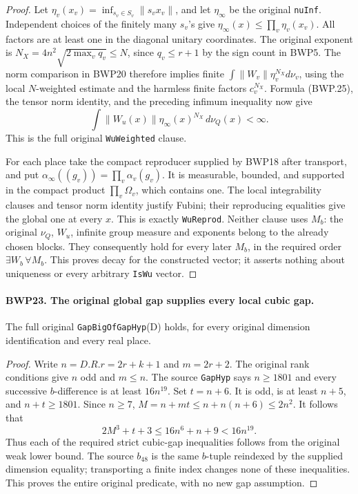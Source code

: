 \begin{proof}
Let \(\eta_v(x_v)=\inf_{s_v\in S_v}\|s_vx_v\|\), and
let \(\eta_\infty\) be the original \texttt{nuInf}.
Independent choices of the finitely many \(s_v\)'s give
\(\eta_\infty(x)\le\prod_v\eta_v(x_v)\).
All factors are at least one in the diagonal unitary coordinates.
The original exponent is
\(N_X=4n^2\sqrt{2\max_v q_v}\le N\), since
\(q_v\le r+1\) by the sign count in BWP5.
The norm comparison in BWP20 therefore implies finite
\(\int\|W_v\|\eta_v^{N_X}d\nu_v\), using the local
\(N\)-weighted estimate and the harmless finite factors
\(c_v^{N_X}\).  Formula (BWP.25), the tensor norm identity, and
the preceding infimum inequality now give
\[
 \int\|W_u(x)\|\eta_\infty(x)^{N_X}\,d\nu_Q(x)<\infty.
 \tag{BWP.27}
\]
This is the full original \texttt{WuWeighted} clause.

For each place take the compact reproducer supplied by BWP18 after
transport, and put \(\alpha_\infty((g_v))=\prod_v\alpha_v(g_v)\).
It is measurable, bounded, and supported in the compact product
\(\prod_v\Omega_v\), which contains one.  The local integrability
clauses and tensor norm identity justify Fubini; their reproducing
equalities give the global one at every \(x\).  This is exactly
\texttt{WuReprod}.  Neither clause uses \(M_b\): the original
\(\nu_Q\), \(W_u\), infinite group measure and exponents belong
to the already chosen blocks.  They consequently hold for every
later \(M_b\), in the required order \(\exists W_b\,\forall M_b\).
This proves decay for the constructed vector; it asserts nothing
about uniqueness or every arbitrary \texttt{IsWu} vector.
\end{proof}

\paragraph{BWP23. The original global gap supplies every local cubic gap.}
\label{claim:BWP23}
The full original \texttt{GapBigOfGapHyp}(D) holds, for every
original dimension identification and every real place.

\begin{proof}
Write \(n=D.R.r=2r+k+1\) and \(m=2r+2\).  The original
rank conditions give \(n\) odd and \(m\le n\).
The source \texttt{GapHyp} says \(n\ge1801\) and every
successive \(b\)-difference is at least \(16n^{19}\).
Set \(t=n+6\).  It is odd, is at least \(n+5\), and
\(n+t\ge1801\).  Since \(n\ge7\),
\(M=n+mt\le n+n(n+6)\le2n^2\).
It follows that
\[
 2M^3+t+3\le16n^6+n+9<16n^{19}.
\]
Thus each of the required strict cubic-gap inequalities follows from
the original weak lower bound.  The source \(b_{48}\) is the
same \(b\)-tuple reindexed by the supplied dimension equality;
transporting a finite index changes none of these inequalities.
This proves the entire original predicate, with no new gap assumption.
\end{proof}

